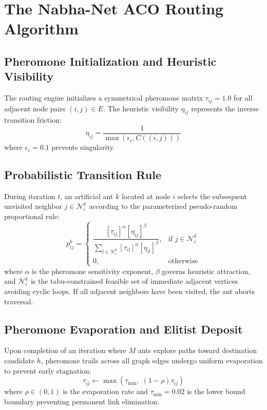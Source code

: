 \documentclass[conference]{IEEEtran}
\begin{document}
\section{The Nabha-Net ACO Routing Algorithm}

\subsection{Pheromone Initialization and Heuristic Visibility}
The routing engine initializes a symmetrical pheromone matrix $\tau_{ij} = 1.0$ for all adjacent node pairs $(i, j) \in E$. The heuristic visibility $\eta_{ij}$ represents the inverse transition friction:
\begin{equation}
\eta_{ij} = \frac{1}{\max(\epsilon_c, C((i, j)))}
\label{eq:heuristic}
\end{equation}
where $\epsilon_c = 0.1$ prevents singularity.

\subsection{Probabilistic Transition Rule}
During iteration $t$, an artificial ant $k$ located at node $i$ selects the subsequent unvisited neighbor $j \in \mathcal{N}_i^k$ according to the parameterized pseudo-random proportional rule:
\begin{equation}
p_{ij}^k = \begin{cases}
\dfrac{[\tau_{ij}]^\alpha [\eta_{ij}]^\beta}{\sum_{l \in \mathcal{N}_i^k} [\tau_{il}]^\alpha [\eta_{il}]^\beta}, & \text{if } j \in \mathcal{N}_i^k \\[10pt]
0, & \text{otherwise}
\end{cases}
\label{eq:prob_transition}
\end{equation}
where $\alpha$ is the pheromone sensitivity exponent, $\beta$ governs heuristic attraction, and $\mathcal{N}_i^k$ is the tabu-constrained feasible set of immediate adjacent vertices avoiding cyclic loops. If all adjacent neighbors have been visited, the ant aborts traversal.

\subsection{Pheromone Evaporation and Elitist Deposit}
Upon completion of an iteration where $M$ ants explore paths toward destination candidate $h$, pheromone trails across all graph edges undergo uniform evaporation to prevent early stagnation:
\begin{equation}
\tau_{ij} \leftarrow \max \left( \tau_{\min}, \; (1 - \rho)\tau_{ij} \right)
\label{eq:evaporation}
\end{equation}
where $\rho \in (0, 1)$ is the evaporation rate and $\tau_{\min} = 0.02$ is the lower bound boundary preventing permanent link elimination.
\end{document}
